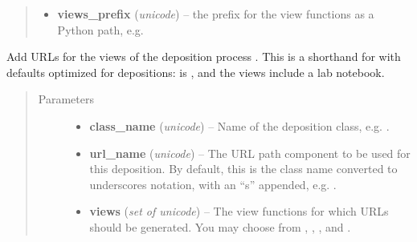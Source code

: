 \documentclass[a4paper,11pt,english]{sphinxmanual}
\begin{document}
\begin{fulllineitems}
\begin{quote}
\begin{description}
\begin{itemize}
\item {} 
\textbf{views\_prefix} (\emph{unicode}) -- the prefix for the view functions as a Python path,
e.g. 

\end{itemize}

\end{description}\end{quote}

\begin{fulllineitems}
\label{programming/utilities:samples.utils.urls.PatternGenerator.deposition}
Add URLs for the views of the deposition process .  This is a
shorthand for  with defaults optimized for
depositions:  is , and the views
include a lab notebook.
\begin{quote}\begin{description}
\item[{Parameters}] \leavevmode\begin{itemize}
\item {} 
\textbf{class\_name} (\emph{unicode}) -- Name of the deposition class,
e.g. .

\item {} 
\textbf{url\_name} (\emph{unicode}) -- The URL path component to be used for this deposition.
By default, this is the class name converted to underscores
notation, with an “s” appended, e.g. .

\item {} 
\textbf{views} (\emph{set of unicode}) -- The view functions for which URLs should be generated.
You may choose from , , , and
.

\end{itemize}

\end{description}\end{quote}

\end{fulllineitems}



\end{fulllineitems}
\end{document}
